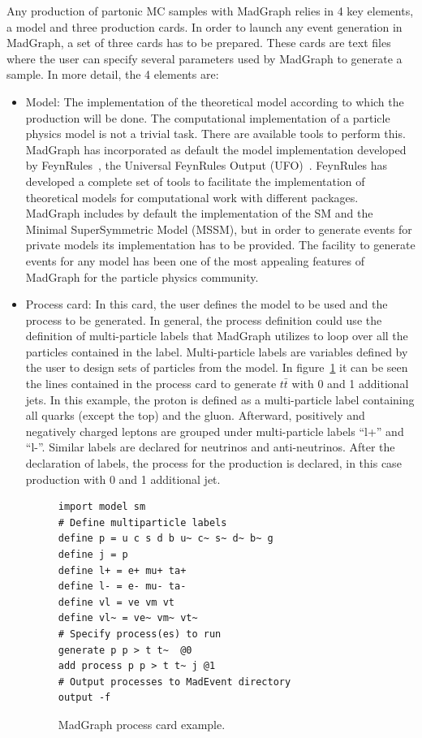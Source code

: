 Any production of partonic MC samples with MadGraph relies in 4 key elements, a model and three production cards. In order to launch any event generation in MadGraph, a set of three cards has to be prepared. These cards are text files where the user can specify several parameters used by MadGraph to generate a sample. In more detail, the 4 elements are:
\begin{itemize}
\item Model: The implementation of the theoretical model according to which the production will be done. The computational implementation of a particle physics model is not a trivial task. There are available tools to perform this. MadGraph has incorporated as default the model implementation developed by FeynRules~\cite{Alloul:2013bka}, the Universal FeynRules Output (UFO)~\cite{Degrande:2011ua}. FeynRules has developed a complete set of tools to facilitate the implementation of theoretical models for computational work with different packages. MadGraph includes by default the implementation of the SM and the Minimal SuperSymmetric Model (MSSM), but in order to generate events for private models its implementation has to be provided. The facility to generate events for any model has been one of the most appealing features of MadGraph for the particle physics community.
\item Process card: In this card, the user defines the model to be used and the process to be generated. In general, the process definition could use the definition of multi-particle labels that MadGraph utilizes to loop over all the particles contained in the label. Multi-particle labels are variables defined by the user to design sets of particles from the model. In figure~\ref{fig:ProcCard} it can be seen the lines contained in the process card to generate $t\bar{t}$ with 0 and 1 additional jets. In this example, the proton is defined as a multi-particle label containing all quarks (except the top) and the gluon. Afterward, positively and negatively charged leptons are grouped under multi-particle labels ``l+'' and ``l-''. Similar labels are declared for neutrinos and anti-neutrinos. After the declaration of labels, the process for the production is declared, in this case \ttbar production with 0 and 1 additional jet.
  \begin{figure}[!Hhtbp]
    \begin{center}
      \begin{minipage}[c]{0.45\textwidth}
\begin{verbatim}
import model sm
# Define multiparticle labels
define p = u c s d b u~ c~ s~ d~ b~ g
define j = p
define l+ = e+ mu+ ta+
define l- = e- mu- ta-
define vl = ve vm vt
define vl~ = ve~ vm~ vt~
# Specify process(es) to run
generate p p > t t~  @0
add process p p > t t~ j @1
# Output processes to MadEvent directory
output -f
\end{verbatim}
        \end{minipage}
          \caption{MadGraph process card example.}
          \label{fig:ProcCard}
      \end{center}
    \end{figure}
    

\end{itemize}
